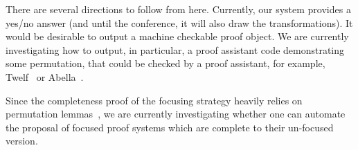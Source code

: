 \documentclass{new_tlp}
\begin{document}
There are several directions to follow from here. Currently, our system provides
a yes/no answer (and until the conference, it will also draw the transformations). 
It would be desirable to output a machine checkable proof object. We are currently 
investigating how to output, in particular, a proof assistant code demonstrating some permutation, 
that could be checked by a proof assistant, for example, Twelf~\cite{schurmann00phd} or 
Abella~\cite{abella.website}. 

Since the completeness proof of the focusing strategy heavily relies on permutation lemmas~\cite{miller07cslb}, 
we are currently investigating whether one can automate the proposal of focused proof
systems which are complete to their un-focused version. 


% 



\end{document}
